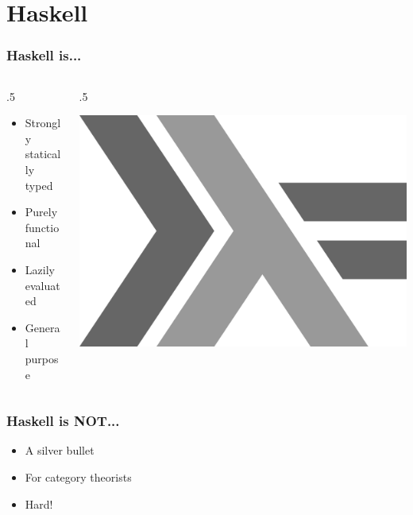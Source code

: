 \documentclass[17pt]{beamer}
\renewcommand{\(}[1]{\begin{columns}[#1]}
\renewcommand{\)}{\end{columns}}
\newcommand{\<}[1]{\begin{column}{#1}}
\renewcommand{\>}{\end{column}}
\begin{document}

\section{Haskell}

\begin{frame}
  \frametitle{Haskell is...}
  \({c}
  \<{.5\textwidth}
  \begin{center}
    \begin{itemize}
    \item Strongly statically typed
    \item Purely functional
    \item Lazily evaluated
    \item General purpose
    \end{itemize}
  \end{center}
  \>
  \<{.5\textwidth}
  \begin{center}
    \includegraphics[width=.5\textwidth]{img/haskell-logo}
  \end{center}
  \>
  \)
\end{frame}

\begin{frame}
  \frametitle{Haskell is NOT...}
  \begin{center}
    \begin{itemize}
    \item A silver bullet
    \item For category theorists
    \item<2-> Hard! 
    \end{itemize}
  \end{center}
\end{frame}
\end{document}
